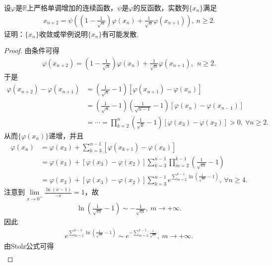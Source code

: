 \documentclass[../../main.tex]{subfiles}
\begin{document}
\begin{example}
设$\varphi$是$\mathbb{R}$上严格单调增加的连续函数，$\psi$是$\varphi$的反函数，实数列$\{x_n\}$满足
\begin{align*}
x_{n+2} = \psi\left( \left(1 - \frac{1}{\sqrt{n}}\right)\varphi(x_n) + \frac{1}{\sqrt{n}}\varphi(x_{n+1}) \right), \, n \geq 2.
\end{align*}
证明：$\{x_n\}$收敛或举例说明$\{x_n\}$有可能发散.
\end{example}
\begin{proof}
由条件可得
\begin{align*}
\varphi(x_{n+2}) = \left(1 - \frac{1}{\sqrt{n}}\right)\varphi(x_n) + \frac{1}{\sqrt{n}}\varphi(x_{n+1}),\ \ n \geq 2.
\end{align*}
于是
\begin{align*}
\varphi(x_{n+2}) - \varphi(x_{n+1}) &= \left( \frac{1}{\sqrt{n}} - 1 \right)\left[ \varphi(x_{n+1}) - \varphi(x_n) \right] \\
&= \left( \frac{1}{\sqrt{n}} - 1 \right)\left( \frac{1}{\sqrt{n-1}} - 1 \right)\left[ \varphi(x_n) - \varphi(x_{n-1}) \right] \\
&= \cdots = \prod_{k=2}^n \left( \frac{1}{\sqrt{k}} - 1 \right)\left[ \varphi(x_3) - \varphi(x_2) \right] > 0,\ \forall n \geq 2.
\end{align*}
从而$\{\varphi(x_n)\}$递增，并且
\begin{align}
\varphi(x_n) &= \varphi(x_3) + \sum\limits_{k=3}^{n-1} \left[ \varphi(x_{k+1}) - \varphi(x_k) \right]\nonumber \\
&= \varphi(x_3) + \left[ \varphi(x_3) - \varphi(x_2) \right] \sum\limits_{k=3}^{n-1} \prod_{m=2}^{k-1} \left( \frac{1}{\sqrt{m}} - 1 \right) \nonumber \\
&= \varphi(x_3) + \left[ \varphi(x_3) - \varphi(x_2) \right] \sum\limits_{k=3}^{n-1} e^{\sum\limits_{m=2}^{k-1} \ln\left( \frac{1}{\sqrt{m}} - 1 \right)},\ \forall n \geq 4. \label{eq::382wer346456yt34t3y4g44j76k67opp}
\end{align}
注意到$\lim\limits_{x \to 0^+} \frac{\ln(x - 1)}{-x} = 1$，故
\begin{align*}
\ln\left( \frac{1}{\sqrt{m}} - 1 \right) \sim -\frac{1}{\sqrt{m}},\ m \to +\infty.
\end{align*}
因此
\begin{align*}
e^{\sum\limits_{m=2}^{k-1} \ln\left( \frac{1}{\sqrt{m}} - 1 \right)} \sim e^{-\sum\limits_{m=2}^{k-1} \frac{1}{\sqrt{m}}},\ m \to +\infty.
\end{align*}
由Stolz公式可得
\begin{align*}

\end{align*}
\end{proof}
\end{document}
